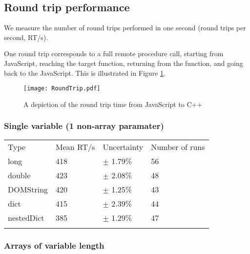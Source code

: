 \subsection{Round trip performance}\label{round-trip-performance}

We measure the number of round trips performed in one second (round trips per second, RT/s).

One round trip corresponds to a full remote procedure call, starting from JavaScript, reaching the target function, returning from the function, and going back to the JavaScript. This is illustrated in Figure \ref{fig:rpc_roundtrip}.


\begin{figure}
    \centering
    \texttt{[image: RoundTrip.pdf]} 
    \caption{A depiction of the round trip time from JavaScript to C++}
    \label{fig:rpc_roundtrip}
\end{figure}


\subsubsection{Single variable (1 non-array
paramater)}\label{single-variable-1-non-array-paramater}

\begin{longtable}[c]{@{}llll@{}}
\toprule\addlinespace
Type & Mean RT/s & Uncertainty & Number of runs
\\\addlinespace
\midrule\endhead
long & 418 & $\pm$  1.79\% & 56
\\\addlinespace
double & 423 & $\pm$  2.08\% & 48
\\\addlinespace
DOMString & 420 & $\pm$  1.25\% & 43
\\\addlinespace
dict & 415 & $\pm$  2.39\% & 44
\\\addlinespace
nestedDict & 385 & $\pm$  1.29\% & 47
\\\addlinespace
\bottomrule
\end{longtable}

\subsubsection{Arrays of variable
length}\label{arrays-of-variable-length}

